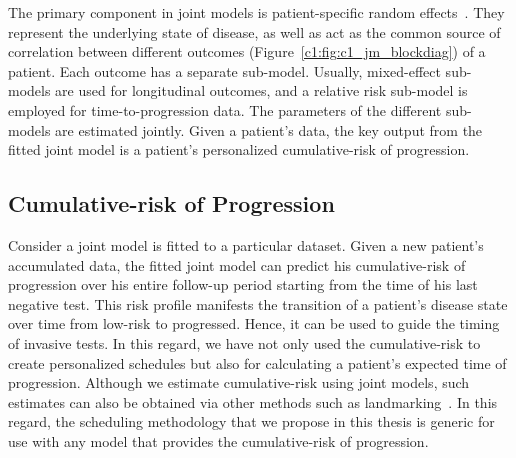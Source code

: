 The primary component in joint models is patient-specific random effects~\citep{laird1982random}. They represent the underlying state of disease, as well as act as the common source of correlation between different outcomes (Figure~\ref{c1:fig:c1_jm_blockdiag}) of a patient. Each outcome has a separate sub-model. Usually, mixed-effect sub-models are used for longitudinal outcomes, and a relative risk sub-model is employed for time-to-progression data. The parameters of the different sub-models are estimated jointly. Given a patient's data, the key output from the fitted joint model is a patient's personalized cumulative-risk of progression.

\subsection{Cumulative-risk of Progression}
Consider a joint model is fitted to a particular dataset. Given a new patient's accumulated data, the fitted joint model can predict his cumulative-risk of progression over his entire follow-up period starting from the time of his last negative test. This risk profile manifests the transition of a patient's disease state over time from low-risk to progressed. Hence, it can be used to guide the timing of invasive tests. In this regard, we have not only used the cumulative-risk to create personalized schedules but also for calculating a patient's expected time of progression. Although we estimate cumulative-risk using joint models, such estimates can also be obtained via other methods such as landmarking~\citep{hansVan2007dynamic}. In this regard, the scheduling methodology that we propose in this thesis is generic for use with any model that provides the cumulative-risk of progression.